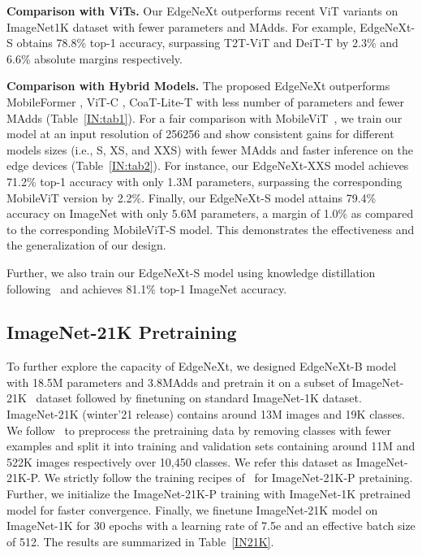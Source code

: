 \documentclass[runningheads]{llncs}
\begin{document}
\noindent\textbf{Comparison with ViTs.} Our EdgeNeXt outperforms recent ViT variants on ImageNet1K dataset with fewer parameters and MAdds. For example, EdgeNeXt-S obtains 78.8\% top-1 accuracy, surpassing T2T-ViT \cite{T2T} and DeiT-T \cite{DeiT} by 2.3\% and 6.6\% absolute margins respectively.
 
\noindent\textbf{Comparison with Hybrid Models.} The proposed EdgeNeXt outperforms MobileFormer \cite{MobileFormer}, ViT-C \cite{ViT-C}, CoaT-Lite-T \cite{dai2021coatnet} with less number of parameters and fewer MAdds (Table~\ref{IN:tab1}). For a fair comparison with MobileViT~\cite{MobileViT}, we train our model at an input resolution of 256256 and show consistent gains for different models sizes (i.e., S, XS, and XXS) with fewer MAdds and faster inference on the edge devices (Table~\ref{IN:tab2}). For instance, our EdgeNeXt-XXS model achieves 71.2\% top-1 accuracy with only 1.3M parameters, surpassing the corresponding MobileViT version by 2.2\%. Finally, our EdgeNeXt-S model attains 79.4\% accuracy on ImageNet with only 5.6M parameters, a margin of 1.0\% as compared to the corresponding MobileViT-S model. This demonstrates the effectiveness and the generalization of our design.

Further, we also train our EdgeNeXt-S model using knowledge distillation following~\cite{usi} and achieves 81.1\% top-1 ImageNet accuracy.

\subsection{ImageNet-21K Pretraining}
To further explore the capacity of EdgeNeXt, we designed EdgeNeXt-B model with 18.5M parameters and 3.8MAdds and pretrain it on a subset of ImageNet-21K~\cite{imagenet} dataset followed by finetuning on standard ImageNet-1K dataset. ImageNet-21K (winter’21 release) contains around 13M images and 19K classes. We follow~\cite{ridnik2021imagenet} to preprocess the pretraining data by removing classes with fewer examples and split it into training and validation sets containing around 11M and 522K images respectively over 10,450 classes. We refer this dataset as ImageNet-21K-P. We strictly follow the training recipes of~\cite{ConvNeXt} for ImageNet-21K-P pretaining. Further, we initialize the ImageNet-21K-P training with ImageNet-1K pretrained model for faster convergence. Finally, we finetune ImageNet-21K model on ImageNet-1K for 30 epochs with a learning rate of 7.5e and an effective batch size of 512. The results are summarized in Table~\ref{IN21K}.
\end{document}
